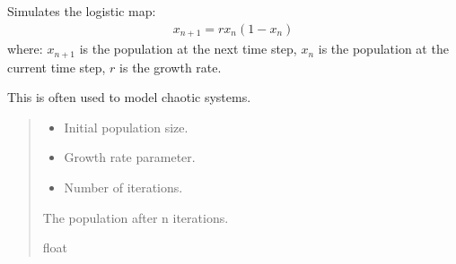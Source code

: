 \documentclass[a4paper,14pt,oneside,english,openany]{sphinxmanual}
\begin{document}
\begin{fulllineitems}
\label{\detokenize{newtest:newtest.logistic_map}}
\pysigstartsignatures
{}
\pysigstopsignatures
\sphinxAtStartPar
Simulates the logistic map:
\begin{equation*}
\begin{split}x_{n+1} = r x_n (1 - x_n)\end{split}
\end{equation*}
\sphinxAtStartPar
where:
\sphinxhyphen{} \(x_{n+1}\) is the population at the next time step,
\sphinxhyphen{} \(x_n\) is the population at the current time step,
\sphinxhyphen{} \(r\) is the growth rate.

\sphinxAtStartPar
This is often used to model chaotic systems.
\begin{quote}\begin{description}
\begin{itemize}
\item {} 
\sphinxAtStartPar
{} \textendash{} Initial population size.

\item {} 
\sphinxAtStartPar
{} \textendash{} Growth rate parameter.

\item {} 
\sphinxAtStartPar
{} \textendash{} Number of iterations.

\end{itemize}

\sphinxAtStartPar
The population after n iterations.

\sphinxAtStartPar
float

\end{description}\end{quote}

\end{fulllineitems}

\end{document}
